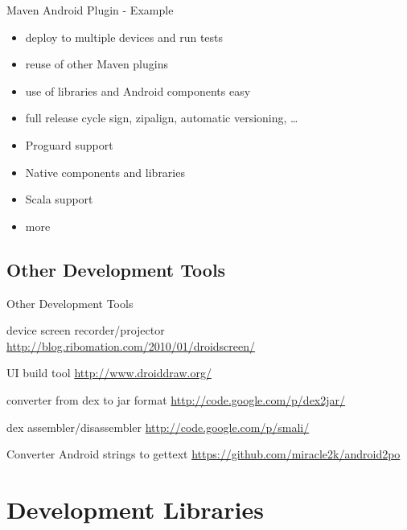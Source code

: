\documentclass[aspectratio=169]{beamer}
\newcommand{\surl}[1] {{\tiny \url{#1}}}
\begin{document}
    \begin{frame}{Maven Android Plugin - Example}
      \begin{itemize}
        \item<1-> deploy to multiple devices and run tests
        \item<2-> reuse of other Maven plugins
        \item<3-> use of libraries and Android components easy
        \item<4-> full release cycle sign, zipalign, automatic versioning, \dots
        \item<5-> Proguard support
        \item<6-> Native components and libraries
        \item<7-> Scala support
        \item<8-> more
      \end{itemize}
    \end{frame}



  \subsection{Other Development Tools}

    \begin{frame}{Other Development Tools}
      \begin{description}
        \item<1->[Droid at Screen] device screen recorder/projector \surl{http://blog.ribomation.com/2010/01/droidscreen/}

        \item<2->[DroidDraw] UI build tool \surl{http://www.droiddraw.org/}
 
        \item<3->[dex2jar] converter from dex to jar format \surl{http://code.google.com/p/dex2jar/}

        \item<4->[smali/baksmali] dex assembler/disassembler \surl{http://code.google.com/p/smali/}

        \item<5->[Android2PO] Converter Android strings to gettext \surl{https://github.com/miracle2k/android2po}
      \end{description}
   \end{frame}

\section{Development Libraries}
\end{document}
